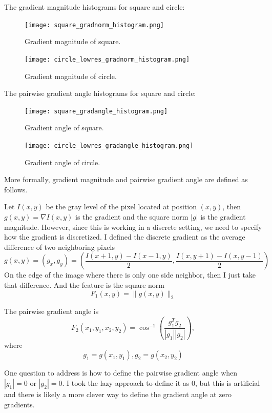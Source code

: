 \documentclass[11pt,letterpaper]{article}
\begin{document}
The gradient magnitude histograms for square and circle:

\begin{figure}[H]
  \centering
  \begin{minipage}[b]{0.45\textwidth}
    \texttt{[image: square\_gradnorm\_histogram.png]}
    \caption{Gradient magnitude of square.}
  \end{minipage}
  \hfill
    \begin{minipage}[b]{0.45\textwidth}
    \texttt{[image: circle\_lowres\_gradnorm\_histogram.png]}
    \caption{Gradient magnitude of circle.}
  \end{minipage}
\end{figure}

The pairwise gradient angle histograms for square and circle:

\begin{figure}[H]
  \centering
  \begin{minipage}[b]{0.45\textwidth}
    \texttt{[image: square\_gradangle\_histogram.png]}
    \caption{Gradient angle of square.}
  \end{minipage}
  \hfill
    \begin{minipage}[b]{0.45\textwidth}
    \texttt{[image: circle\_lowres\_gradangle\_histogram.png]}
    \caption{Gradient angle of circle.}
  \end{minipage}
\end{figure}

More formally, gradient magnitude and pairwise gradient angle are defined as follows. 

Let $I(x,y)$ be the gray level of the pixel located at position $(x,y)$, then $g(x,y) = \nabla I(x,y)$ is the gradient and the square norm $|g|$ is the gradient magnitude. However, since this is working in a discrete setting, we need to specify how the gradient is discretized. I defined the discrete gradient as the average difference of two neighboring pixels \[g(x,y) = (g_x, g_y) = \left(\frac{I(x+1,y) - I(x-1,y)}{2},\frac{I(x,y+1)-I(x,y-1)}{2}\right)\]
On the edge of the image where there is only one side neighbor, then I just take that difference. And the feature is the square norm
\[F_1(x,y) = \|g(x,y)\|_2\]

The pairwise gradient angle is 
\[F_2(x_1,y_1,x_2,y_2) = \cos^{-1}\left(\frac{g_1^Tg_2}{|g_1||g_2|}\right),\] where
\[g_1 = g(x_1,y_1), g_2 = g(x_2,y_2)\]

One question to address is how to define the pairwise gradient angle when $|g_1| = 0$ or $|g_2| = 0$. I took the lazy approach to define it as 0, but this is artificial and there is likely a more clever way to define the gradient angle at zero gradients.
\end{document}
